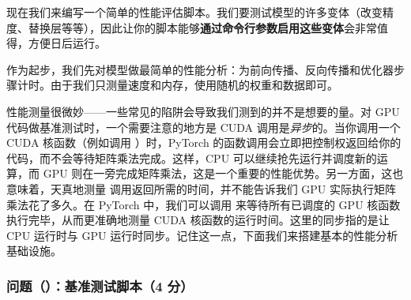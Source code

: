 现在我们来编写一个简单的性能评估脚本。我们要测试模型的许多变体（改变精度、替换层等等），因此让你的脚本能够\textbf{通过命令行参数启用这些变体}会非常值得，方便日后运行。

作为起步，我们先对模型做最简单的性能分析：为前向传播、反向传播和优化器步骤计时。由于我们只测量速度和内存，使用随机的权重和数据即可。

性能测量很微妙——一些常见的陷阱会导致我们测到的并不是想要的量。对 GPU 代码做基准测试时，一个需要注意的地方是 CUDA 调用是\emph{异步}的。当你调用一个 CUDA 核函数（例如调用 ）时，PyTorch 的函数调用会立即把控制权返回给你的代码，而不会等待矩阵乘法完成。这样，CPU 可以继续抢先运行并调度新的运算，而 GPU 则在一旁完成矩阵乘法，这是一个重要的性能优势。另一方面，这也意味着，天真地测量  调用返回所需的时间，并不能告诉我们 GPU 实际执行矩阵乘法花了多久。在 PyTorch 中，我们可以调用  来等待所有已调度的 GPU 核函数执行完毕，从而更准确地测量 CUDA 核函数的运行时间。这里的同步指的是让 CPU 运行时与 GPU 运行时同步。记住这一点，下面我们来搭建基本的性能分析基础设施。

\subsubsection*{问题（）：基准测试脚本（4 分）}

